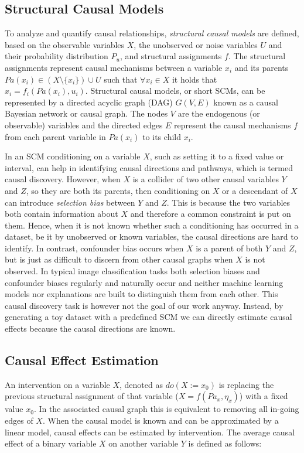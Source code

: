 \subsection{Structural Causal Models}
To analyze and quantify causal relationships, \textit{structural causal models} are defined, based on the observable variables $X$, the unobserved or noise variables $U$ and their probability distribution $P_u$, and structural assignments $f$. The structural assignments represent causal mechanisms between a variable $x_i$ and its parents $Pa(x_i) \in (X \setminus \{x_i\}) \cup U$ such that $\forall x_i \in X$ it holds that $x_i = f_i(Pa(x_i),u_i)$. 
Structural causal models, or short SCMs, can be represented by a directed acyclic graph (DAG) $G(V,E)$ known as a causal Bayesian network or causal graph. The nodes $V$ are the endogenous (or observable) variables and the directed edges $E$ represent the causal mechanisms $f$ from each parent variable in $Pa(x_i)$ to its child $x_i$. 

In an SCM conditioning on a variable $X$, such as setting it to a fixed value or interval, can help in identifying causal directions and pathways, which is termed causal discovery. However, when $X$ is a collider of two other causal variables $Y$ and $Z$, so they are both its parents, then conditioning on $X$ or a descendant of $X$ can introduce \textit{selection bias} between $Y$ and $Z$. This is because the two variables both contain information about $X$ and therefore a common constraint is put on them. Hence, when it is not known whether such a conditioning has occurred in a dataset, be it by unobserved or known variables, the causal directions are hard to identify. In contrast, confounder bias occurs when $X$ is a parent of both $Y$ and $Z$, but is just as difficult to discern from other causal graphs when $X$ is not observed. In typical image classification tasks both selection biases and confounder biases regularly and naturally occur and neither machine learning models nor explanations are built to distinguish them from each other. This causal discovery task is however not the goal of our work anyway. Instead, by generating a toy dataset with a predefined SCM we can directly estimate causal effects because the causal directions are known.

\subsection{Causal Effect Estimation}
An intervention on a variable $X$, denoted as $do(X := x_0)$ is replacing the previous structural assignment of that variable ($X = f(Pa_x, \eta_x)$) with a fixed value $x_0$. 
In the associated causal graph this is equivalent to removing all in-going edges of $X$.
When the causal model is known and can be approximated by a linear model, causal effects can be estimated by intervention. The average causal effect of a binary variable $X$ on another variable $Y$ is defined as follows:

